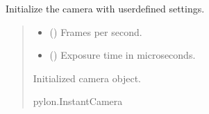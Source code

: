 \documentclass[letterpaper,10pt,english]{sphinxmanual}
\begin{document}
\begin{fulllineitems}
\label{\detokenize{PoseEstimator:PoseEstimator.pose_estimator.initialize_camera}}
\pysigstartsignatures
{}
\pysigstopsignatures
\sphinxAtStartPar
Initialize the camera with user\sphinxhyphen{}defined settings.
\begin{quote}\begin{description}
\begin{itemize}
\item {} 
\sphinxAtStartPar
{} () \textendash{} Frames per second.

\item {} 
\sphinxAtStartPar
{} () \textendash{} Exposure time in microseconds.

\end{itemize}

\sphinxAtStartPar
Initialized camera object.

\sphinxAtStartPar
pylon.InstantCamera

\end{description}\end{quote}

\end{fulllineitems}

\end{document}
